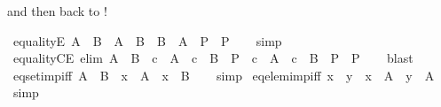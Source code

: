 \begin{isabellebody}
\begin{isamarkuptext}
  and then back to !%
\end{isamarkuptext}\isamarkuptrue%
\isamarkupfalse%
\ equalityE{\isacharcolon}{\kern0pt}\ {\isachardoublequoteopen}A\ {\isacharequal}{\kern0pt}\ B\ {\isasymLongrightarrow}\ {\isacharparenleft}{\kern0pt}A\ {\isasymsubseteq}\ B\ {\isasymLongrightarrow}\ B\ {\isasymsubseteq}\ A\ {\isasymLongrightarrow}\ P{\isacharparenright}{\kern0pt}\ {\isasymLongrightarrow}\ P{\isachardoublequoteclose}\isanewline
%
\isadelimproof
\ \ %
\endisadelimproof
%
\isatagproof
{}\isamarkupfalse%
\ simp%
\endisatagproof
{\isafoldproof}%
%
\isadelimproof
\isanewline
%
\endisadelimproof
\isanewline
{}\isamarkupfalse%
\ equalityCE\ {\isacharbrackleft}{\kern0pt}elim{\isacharbrackright}{\kern0pt}{\isacharcolon}{\kern0pt}\ {\isachardoublequoteopen}A\ {\isacharequal}{\kern0pt}\ B\ {\isasymLongrightarrow}\ {\isacharparenleft}{\kern0pt}c\ {\isasymin}\ A\ {\isasymLongrightarrow}\ c\ {\isasymin}\ B\ {\isasymLongrightarrow}\ P{\isacharparenright}{\kern0pt}\ {\isasymLongrightarrow}\ {\isacharparenleft}{\kern0pt}c\ {\isasymnotin}\ A\ {\isasymLongrightarrow}\ c\ {\isasymnotin}\ B\ {\isasymLongrightarrow}\ P{\isacharparenright}{\kern0pt}\ {\isasymLongrightarrow}\ P{\isachardoublequoteclose}\isanewline
%
\isadelimproof
\ \ %
\endisadelimproof
%
\isatagproof
{}\isamarkupfalse%
\ blast%
\endisatagproof
{\isafoldproof}%
%
\isadelimproof
\isanewline
%
\endisadelimproof
\isanewline
{}\isamarkupfalse%
\ eqset{\isacharunderscore}{\kern0pt}imp{\isacharunderscore}{\kern0pt}iff{\isacharcolon}{\kern0pt}\ {\isachardoublequoteopen}A\ {\isacharequal}{\kern0pt}\ B\ {\isasymLongrightarrow}\ x\ {\isasymin}\ A\ {\isasymlongleftrightarrow}\ x\ {\isasymin}\ B{\isachardoublequoteclose}\isanewline
%
\isadelimproof
\ \ %
\endisadelimproof
%
\isatagproof
{}\isamarkupfalse%
\ simp%
\endisatagproof
{\isafoldproof}%
%
\isadelimproof
\isanewline
%
\endisadelimproof
\isanewline
{}\isamarkupfalse%
\ eqelem{\isacharunderscore}{\kern0pt}imp{\isacharunderscore}{\kern0pt}iff{\isacharcolon}{\kern0pt}\ {\isachardoublequoteopen}x\ {\isacharequal}{\kern0pt}\ y\ {\isasymLongrightarrow}\ x\ {\isasymin}\ A\ {\isasymlongleftrightarrow}\ y\ {\isasymin}\ A{\isachardoublequoteclose}\isanewline
%
\isadelimproof
\ \ %
\endisadelimproof
%
\isatagproof
{}\isamarkupfalse%
\ simp%
\endisatagproof
{\isafoldproof}%
%
\isadelimproof
%
\endisadelimproof
%
\isadelimdocument
%
\endisadelimdocument

\end{isabellebody}
